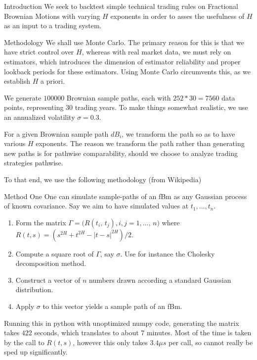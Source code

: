 \documentclass[12pt]{article}
\theoremstyle{definition}
\numberwithin{equation}{section}
\numberwithin{example}{section}
\begin{document}
\begin{section}{Introduction}
	We seek to backtest simple technical trading rules on Fractional Brownian
	Motions with varying $H$ exponents in order to asses the usefulness of
	$H$ as an input to a trading system.
\end{section}

\begin{section}{Methodology}
	We shall use Monte Carlo. The primary reason for this is that
	we have strict control over $H$, whereas with real market data, we must rely
	on estimators, which introduces the dimension of estimator reliability
	and proper lookback periods for these estimators. Using Monte Carlo
	circumvents this, as we establish $H$ a priori.

	We generate $100000$ Brownian sample paths, each with $252*30=7560$
	data points, representing $30$ trading years. To make things somewhat
	realistic, we use	an annualized volatility $\sigma = 0.3$.

	For a given Brownian sample path ${dB}_i$, we transform the path so as
	to have	various $H$ exponents. The reason we transform the path rather than
	generating new paths is for pathwise comparability, should we choose to
	analyze trading strategies pathwise.

	To that end, we use the following methodology (from Wikipedia)
	\begin{subsection}{Method One}
		One can simulate sample-paths of an fBm as any Gaussian process 
		of known covariance. Say we aim to have simulated values at
		$t_1, \ldots, t_n$.
		\begin{enumerate}
			\item Form the matrix $\Gamma=\bigl(R(t_i,\, t_j), i,j=1,\ldots,\, n\bigr)$
				where $R(t,s)=(s^{2H}+t^{2H}-|t-s|^{2H})/2$.
			\item Compute a square root of $\Gamma$, say $\sigma$. Use for instance
				the Cholesky decomposition method.
			\item Construct a vector of $n$ numbers drawn according a standard
				Gaussian distribution.
			\item Apply $\sigma$ to this vector yields a sample path of an fBm.
		\end{enumerate}

		Running this in python with unoptimized numpy code, generating the matrix
		takes $422$ seconds, which translates to about $7$ minutes. Most of the
		time is taken by the call to $R(t,s)$, however this only takes
		$3.4 \mu s$ per call, so cannot really be sped up significantly.
	\end{subsection}


\end{section}
\end{document}
